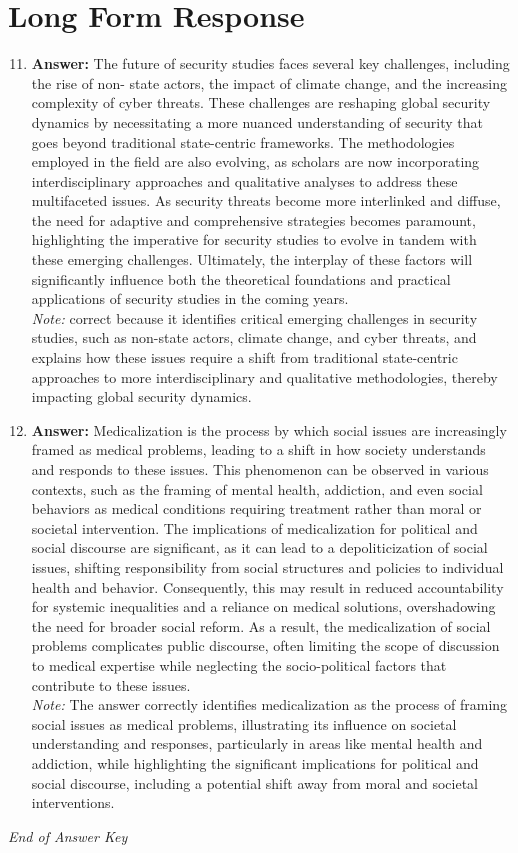 \documentclass[12pt]{article}
\begin{document}
\section*{Long Form Response}
\begin{enumerate}[label=\arabic*.]
\setcounter{enumi}{10}
\item \textbf{Answer:} The future of security studies faces several key challenges, including the rise of non- state actors, the impact of climate change, and the increasing complexity of cyber threats. These challenges are reshaping global security dynamics by necessitating a more nuanced understanding of security that goes beyond traditional state-centric frameworks. The methodologies employed in the field are also evolving, as scholars are now incorporating interdisciplinary approaches and qualitative analyses to address these multifaceted issues. As security threats become more interlinked and diffuse, the need for adaptive and comprehensive strategies becomes paramount, highlighting the imperative for security studies to evolve in tandem with these emerging challenges. Ultimately, the interplay of these factors will significantly influence both the theoretical foundations and practical applications of security studies in the coming years.
\\ \textit{Note:} correct because it identifies critical emerging challenges in security studies, such as non-state actors, climate change, and cyber threats, and explains how these issues require a shift from traditional state-centric approaches to more interdisciplinary and qualitative methodologies, thereby impacting global security dynamics.
\item \textbf{Answer:} Medicalization is the process by which social issues are increasingly framed as medical problems, leading to a shift in how society understands and responds to these issues. This phenomenon can be observed in various contexts, such as the framing of mental health, addiction, and even social behaviors as medical conditions requiring treatment rather than moral or societal intervention. The implications of medicalization for political and social discourse are significant, as it can lead to a depoliticization of social issues, shifting responsibility from social structures and policies to individual health and behavior. Consequently, this may result in reduced accountability for systemic inequalities and a reliance on medical solutions, overshadowing the need for broader social reform. As a result, the medicalization of social problems complicates public discourse, often limiting the scope of discussion to medical expertise while neglecting the socio-political factors that contribute to these issues.
\\ \textit{Note:} The answer correctly identifies medicalization as the process of framing social issues as medical problems, illustrating its influence on societal understanding and responses, particularly in areas like mental health and addiction, while highlighting the significant implications for political and social discourse, including a potential shift away from moral and societal interventions.
\end{enumerate}

\vfill
\noindent\textit{End of Answer Key}
\end{document}
